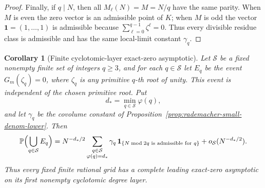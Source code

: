 \documentclass[11pt]{amsart}
\numberwithin{equation}{section}
\newtheorem{corollary}[theorem]{Corollary}
\theoremstyle{definition}
\theoremstyle{remark}
\newcommand{\Prob}{\mathbb P}
\begin{document}
\begin{proof}
Finally, if \(q\mid N\), then all \(M_\ell(N)=M=N/q\) have the same parity.
When \(M\) is even the zero vector is an admissible point of \(K\); when \(M\)
is odd the vector \(\mathbf1=(1,\ldots,1)\) is admissible because
\(\sum_{\ell=0}^{q-1}\zeta^\ell=0\).  Thus every divisible residue class is
admissible and has the same local-limit constant \(\gamma_q\).
\end{proof}

\begin{corollary}[Finite cyclotomic-layer exact-zero asymptotic]
\label{cor:rademacher-finite-layer-zero}
Let \(\mathcal S\) be a fixed nonempty finite set of integers \(q\ge3\), and
for each \(q\in\mathcal S\) let \(E_q\) be the event \(G_m(\zeta_q)=0\), where
\(\zeta_q\) is any primitive \(q\)-th root of unity.  This event is independent
of the chosen primitive root.  Put
\[
  d_*=\min_{q\in\mathcal S}\varphi(q),
\]
and let \(\gamma_q\) be the covolume constant of
Proposition~\ref{prop:rademacher-small-denom-lower}.  Then
\[
  \Prob\Bigl(\bigcup_{q\in\mathcal S}E_q\Bigr)
  =N^{-d_*/2}
    \sum_{\substack{q\in\mathcal S\\ \varphi(q)=d_*}}
      \gamma_q\,\mathbf1_{\{N\bmod 2q\text{ is admissible for }q\}}
    +o_{\mathcal S}(N^{-d_*/2}).
\]
Thus every fixed finite rational grid has a complete leading exact-zero
asymptotic on its first nonempty cyclotomic degree layer.
\end{corollary}
\end{document}
